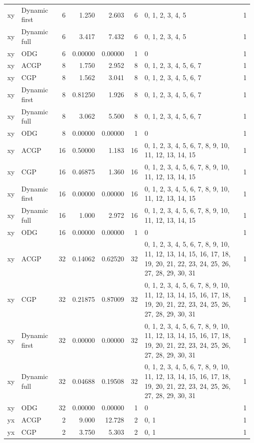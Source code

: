 \documentclass[10pt,a4paper]{article}
\begin{document}
\begin{longtable}{@{}p{23mm}p{29mm}rrrrp{36mm}r@{}}
xy & Dynamic first & 6 & 1.250 & 2.603 & 6 & 0, 1, 2, 3, 4, 5 & 1 \\
xy & Dynamic full & 6 & 3.417 & 7.432 & 6 & 0, 1, 2, 3, 4, 5 & 1 \\
xy & ODG & 6 & 0.00000 & 0.00000 & 1 & 0 & 1 \\
xy & ACGP & 8 & 1.750 & 2.952 & 8 & 0, 1, 2, 3, 4, 5, 6, 7 & 1 \\
xy & CGP & 8 & 1.562 & 3.041 & 8 & 0, 1, 2, 3, 4, 5, 6, 7 & 1 \\
xy & Dynamic first & 8 & 0.81250 & 1.926 & 8 & 0, 1, 2, 3, 4, 5, 6, 7 & 1 \\
xy & Dynamic full & 8 & 3.062 & 5.500 & 8 & 0, 1, 2, 3, 4, 5, 6, 7 & 1 \\
xy & ODG & 8 & 0.00000 & 0.00000 & 1 & 0 & 1 \\
xy & ACGP & 16 & 0.50000 & 1.183 & 16 & 0, 1, 2, 3, 4, 5, 6, 7, 8, 9, 10, 11, 12, 13, 14, 15 & 1 \\
xy & CGP & 16 & 0.46875 & 1.360 & 16 & 0, 1, 2, 3, 4, 5, 6, 7, 8, 9, 10, 11, 12, 13, 14, 15 & 1 \\
xy & Dynamic first & 16 & 0.00000 & 0.00000 & 16 & 0, 1, 2, 3, 4, 5, 6, 7, 8, 9, 10, 11, 12, 13, 14, 15 & 1 \\
xy & Dynamic full & 16 & 1.000 & 2.972 & 16 & 0, 1, 2, 3, 4, 5, 6, 7, 8, 9, 10, 11, 12, 13, 14, 15 & 1 \\
xy & ODG & 16 & 0.00000 & 0.00000 & 1 & 0 & 1 \\
xy & ACGP & 32 & 0.14062 & 0.62520 & 32 & 0, 1, 2, 3, 4, 5, 6, 7, 8, 9, 10, 11, 12, 13, 14, 15, 16, 17, 18, 19, 20, 21, 22, 23, 24, 25, 26, 27, 28, 29, 30, 31 & 1 \\
xy & CGP & 32 & 0.21875 & 0.87009 & 32 & 0, 1, 2, 3, 4, 5, 6, 7, 8, 9, 10, 11, 12, 13, 14, 15, 16, 17, 18, 19, 20, 21, 22, 23, 24, 25, 26, 27, 28, 29, 30, 31 & 1 \\
xy & Dynamic first & 32 & 0.00000 & 0.00000 & 32 & 0, 1, 2, 3, 4, 5, 6, 7, 8, 9, 10, 11, 12, 13, 14, 15, 16, 17, 18, 19, 20, 21, 22, 23, 24, 25, 26, 27, 28, 29, 30, 31 & 1 \\
xy & Dynamic full & 32 & 0.04688 & 0.19508 & 32 & 0, 1, 2, 3, 4, 5, 6, 7, 8, 9, 10, 11, 12, 13, 14, 15, 16, 17, 18, 19, 20, 21, 22, 23, 24, 25, 26, 27, 28, 29, 30, 31 & 1 \\
xy & ODG & 32 & 0.00000 & 0.00000 & 1 & 0 & 1 \\
yx & ACGP & 2 & 9.000 & 12.728 & 2 & 0, 1 & 1 \\
yx & CGP & 2 & 3.750 & 5.303 & 2 & 0, 1 & 1 \\

\end{longtable}
\end{document}
